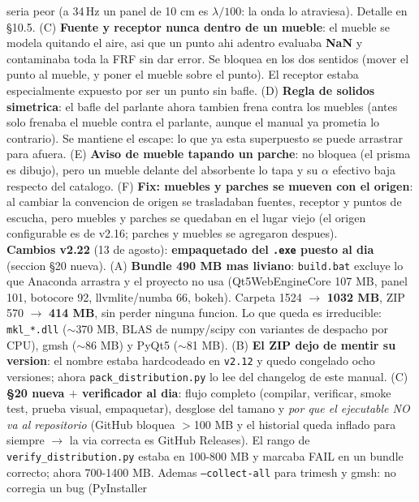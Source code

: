 \documentclass[11pt, a4paper]{article}
\begin{document}
\begin{center}
{    seria peor (a 34\,Hz un panel de 10 cm es $\lambda/100$: la onda lo atraviesa).
    Detalle en \S10.5.
    (C) \textbf{Fuente y receptor nunca dentro de un mueble}: el mueble se modela
    quitando el aire, asi que un punto ahi adentro evaluaba \textbf{NaN} y
    contaminaba toda la FRF sin dar error. Se bloquea en los dos sentidos (mover
    el punto al mueble, y poner el mueble sobre el punto). El receptor estaba
    especialmente expuesto por ser un punto sin bafle.
    (D) \textbf{Regla de solidos simetrica}: el bafle del parlante ahora tambien
    frena contra los muebles (antes solo frenaba el mueble contra el parlante,
    aunque el manual ya prometia lo contrario). Se mantiene el escape: lo que ya
    esta superpuesto se puede arrastrar para afuera.
    (E) \textbf{Aviso de mueble tapando un parche}: no bloquea (el prisma es
    dibujo), pero un mueble delante del absorbente lo tapa y su $\alpha$ efectivo
    baja respecto del catalogo.
    (F) \textbf{Fix: muebles y parches se mueven con el origen}: al cambiar la
    convencion de origen se trasladaban fuentes, receptor y puntos de escucha,
    pero muebles y parches se quedaban en el lugar viejo (el origen configurable
    es de v2.16; parches y muebles se agregaron despues).\\[2pt]
    \textbf{Cambios v2.22} (13 de agosto): \textbf{empaquetado del \texttt{.exe}
    puesto al dia} (seccion \S20 nueva).
    (A) \textbf{Bundle 490 MB mas liviano}: \texttt{build.bat} excluye lo que
    Anaconda arrastra y el proyecto no usa (Qt5WebEngineCore 107 MB, panel 101,
    botocore 92, llvmlite/numba 66, bokeh). Carpeta 1524 $\to$ \textbf{1032 MB},
    ZIP 570 $\to$ \textbf{414 MB}, sin perder ninguna funcion. Lo que queda es
    irreducible: \texttt{mkl\_*.dll} ($\sim$370 MB, BLAS de numpy/scipy con
    variantes de despacho por CPU), gmsh ($\sim$86 MB) y PyQt5 ($\sim$81 MB).
    (B) \textbf{El ZIP dejo de mentir su version}: el nombre estaba hardcodeado
    en \texttt{v2.12} y quedo congelado ocho versiones; ahora
    \texttt{pack\_distribution.py} lo lee del changelog de este manual.
    (C) \textbf{\S20 nueva $+$ verificador al dia}: flujo completo (compilar,
    verificar, smoke test, prueba visual, empaquetar), desglose del tamano y
    \emph{por que el ejecutable NO va al repositorio} (GitHub bloquea $>$100 MB
    y el historial queda inflado para siempre $\to$ la via correcta es GitHub
    Releases). El rango de \texttt{verify\_distribution.py} estaba en 100-800 MB
    y marcaba FAIL en un bundle correcto; ahora 700-1400 MB. Ademas
    \texttt{--collect-all} para trimesh y gmsh: no corregia un bug (PyInstaller
}
\end{center}
\end{document}
